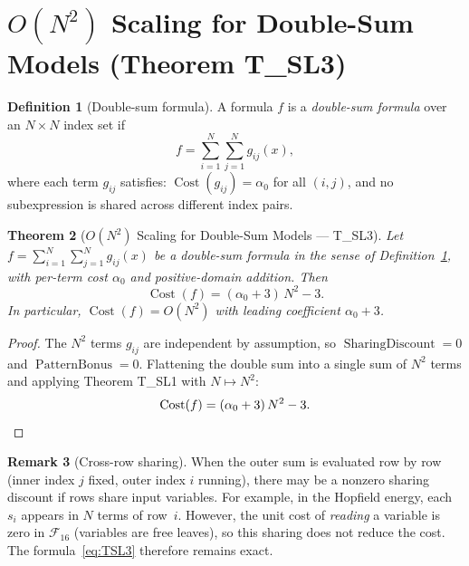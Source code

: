 \documentclass[12pt,a4paper]{article}
\newtheorem{theorem}{Theorem}[section]
\theoremstyle{definition}
\newtheorem{definition}[theorem]{Definition}
\newtheorem{remark}[theorem]{Remark}
\newcommand{\Cost}{\operatorname{Cost}}
\newcommand{\SD}{\operatorname{SharingDiscount}}
\newcommand{\PB}{\operatorname{PatternBonus}}
\begin{document}
\section{$O(N^2)$ Scaling for Double-Sum Models (Theorem T\_SL3)}
\label{sec:quadratic}

\begin{definition}[Double-sum formula]
\label{def:doublesum}
A formula $f$ is a \emph{double-sum formula} over an $N \times N$ index set if
\[
  f = \sum_{i=1}^{N} \sum_{j=1}^{N} g_{ij}(x),
\]
where each term $g_{ij}$ satisfies: $\Cost(g_{ij}) = \alpha_0$ for all $(i,j)$,
and no subexpression is shared across different index pairs.
\end{definition}

\begin{theorem}[$O(N^2)$ Scaling for Double-Sum Models --- T\_SL3]
\label{thm:TSL3}
Let $f = \sum_{i=1}^{N} \sum_{j=1}^{N} g_{ij}(x)$ be a double-sum formula
in the sense of Definition~\ref{def:doublesum}, with per-term cost $\alpha_0$
and positive-domain addition.  Then
\begin{equation}
  \label{eq:TSL3}
  \Cost(f) = (\alpha_0 + 3)\,N^2 - 3.
\end{equation}
In particular, $\Cost(f) = O(N^2)$ with leading coefficient $\alpha_0 + 3$.
\end{theorem}

\begin{proof}
The $N^2$ terms $g_{ij}$ are independent by assumption, so $\SD = 0$
and $\PB = 0$.  Flattening the double sum into a single sum of $N^2$ terms
and applying Theorem T\_SL1 with $N \mapsto N^2$:
\[
  \Cost(f) = (\alpha_0 + 3)\,N^2 - 3. \qedhere
\]
\end{proof}

\begin{remark}[Cross-row sharing]
When the outer sum is evaluated row by row (inner index $j$ fixed, outer index
$i$ running), there may be a nonzero sharing discount if rows share input
variables.  For example, in the Hopfield energy, each $s_i$ appears in $N$
terms of row~$i$.  However, the unit cost of \textit{reading} a variable is
zero in $\mathcal{F}_{16}$ (variables are free leaves), so this sharing does
not reduce the cost.  The formula~\eqref{eq:TSL3} therefore remains exact.
\end{remark}

\end{document}
